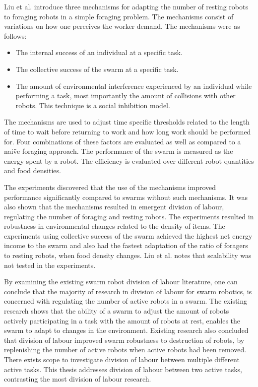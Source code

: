 Liu et al. \cite{liu2007towards} introduce three mechanisms for adapting the number of resting robots to foraging robots in a simple foraging problem. The mechanisms consist of variations on how one perceives the worker demand. The mechanisms were as follows:

\begin{itemize}
	\item The internal success of an individual at a specific task.
	\item The collective success of the swarm at a specific task. 
	\item  The amount of environmental interference experienced by an individual while performing a task, most importantly the amount of collisions with other robots. This technique is a social inhibition model.
\end{itemize}

The mechanisms are used to adjust time specific thresholds related to the length of time to wait before returning to work and how long work should be performed for.
Four combinations of these factors are evaluated as well as compared to a nai\"ve foraging approach. The performance of the swarm is measured as the energy spent by a robot. The efficiency is evaluated over different robot quantities and food densities.

The experiments discovered that the use of the mechanisms improved performance significantly compared to swarms without such mechanisms. It was also shown that the mechanisms resulted in emergent division of labour, regulating the number of foraging and resting robots. The experiments resulted in robustness in environmental changes related to the density of items. The experiments using collective success of the swarm achieved the highest net energy income to the swarm and also had the fastest adaptation of the ratio of foragers to resting robots, when food density changes. Liu et al. \cite{liu2007towards} notes that scalability was not tested in the experiments.

By examining the existing swarm robot division of labour literature, one can conclude that the majority of research in division of labour for swarm robotics, is concerned with regulating the number of active robots in a swarm. The existing research shows that the ability of a swarm to adjust the amount of robots actively participating in a task with the amount of robots at rest, enables the swarm to adapt to changes in the environment. Existing research also concluded that division of labour improved swarm robustness to destruction of robots, by replenishing the number of active robots when active robots had been removed. There exists scope to investigate division of labour between multiple different active tasks. This thesis addresses division of labour between two active tasks, contrasting the most division of labour research.

